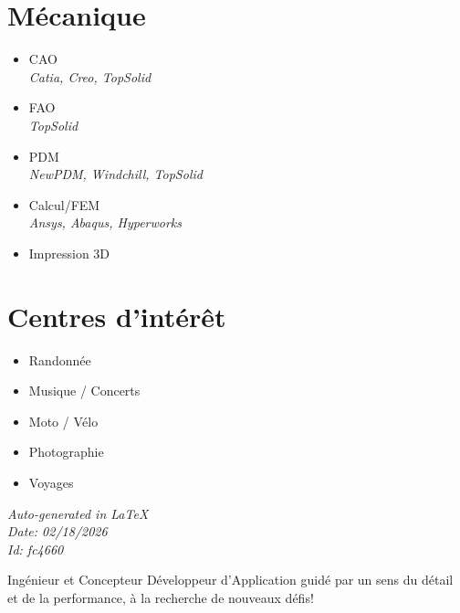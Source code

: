 \documentclass[]{friggeri-cv}
\begin{document}
\begin{aside}
\section{Mécanique}
\begin{itemize}
\item CAO
 \\ \hspace*{0.2em}\small\textit{Catia, Creo, TopSolid}
\item FAO
 \\ \hspace*{0.2em}\small\textit{TopSolid}
\item PDM
 \\ \hspace*{0.2em}\small\textit{NewPDM, Windchill, TopSolid}
\item Calcul/FEM
 \\ \hspace*{0.2em}\small\textit{Ansys, Abaqus, Hyperworks}
\item Impression 3D
\end{itemize}
\section{Centres d'intérêt}
\begin{itemize}
\item Randonnée
\item Musique / Concerts
\item Moto / Vélo
\item Photographie
\item Voyages
\end{itemize}
\vspace{2.5mm}%
\small \emph{Auto-generated in \LaTeX}\\
\small \emph{Date: 02/18/2026} \hspace*{8mm}\\
\small \emph{Id: fc4660} %

\end{aside}

\vspace*{-2.0mm}
\noindent\parbox{\linewidth}{
  \centering
  Ingénieur et Concepteur Développeur d'Application guidé par un sens du détail et de la performance, à la recherche de nouveaux défis!
}
\vspace*{0.8mm}
\end{document}
